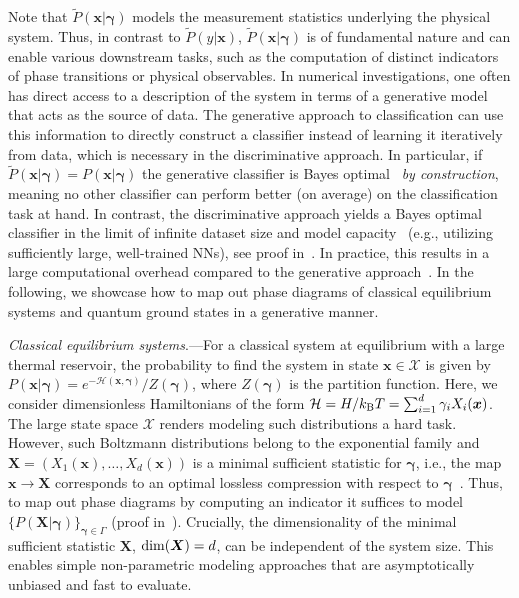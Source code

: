 \documentclass[twocolumn,aps,prl,superscriptaddress,tightlines,nofootinbib]{revtex4-2}
\begin{document}
\indent Note that $\tilde{P}(\bm{x}|\bm{\gamma})$ models the measurement statistics underlying the physical system. Thus, in contrast to $\tilde{P}(y|\bm{x})$, $\tilde{P}(\bm{x}|\bm{\gamma})$ is of fundamental nature and can enable various downstream tasks, such as the computation of distinct indicators of phase transitions or physical observables. In numerical investigations, one often has direct access to a description of the system in terms of a generative model that acts as the source of data. The generative approach to classification can use this information to directly construct a classifier instead of learning it iteratively from data, which is necessary in the discriminative approach. In particular, if $\tilde{P}(\bm{x}|\bm{\gamma}) = P(\bm{x}|\bm{\gamma})$ the generative classifier is Bayes optimal~\cite{devroye2:1996,goodfellow:2016} \textit{by construction}, meaning no other classifier can perform better (on average) on the classification task at hand. In contrast, the discriminative approach yields a Bayes optimal classifier in the limit of infinite dataset size and model capacity~\cite{goodfellow:2016} (e.g., utilizing sufficiently large, well-trained NNs), see proof in~\cite{suppl}. In practice, this results in a large computational overhead compared to the generative approach~\cite{suppl}. In the following, we showcase how to map out phase diagrams of classical equilibrium systems and quantum ground states in a generative manner.%

\indent \emph{Classical equilibrium systems}.---For a classical system at equilibrium with a large thermal reservoir, the probability to find the system in state $\bm{x} \in \mathcal{X}$ is given by $P(\bm{x}| \bm{\gamma}) = e^{-\mathcal{H}(\bm{x},\bm{\gamma})}/Z(\bm{\gamma})$,
where $Z(\bm{\gamma})$ is the partition function. Here, we consider dimensionless Hamiltonians of the form $\mathcal{H} = H/k_{\rm B}T = \sum_{i=1}^{d} \gamma_{i} X_{i}(\bm{x})$. The large state space $\mathcal{X}$ renders modeling such distributions a hard task. However, such Boltzmann distributions belong to the exponential family and $\bm{X} = \left( X_{1}(\bm{x}), \dots, X_{d}(\bm{x}) \right)$ is a minimal sufficient statistic for $\bm{\gamma}$, i.e., the map $\bm{x} \rightarrow \bm{X}$ corresponds to an optimal lossless compression with respect to $\bm{\gamma}$~\cite{non_optimal_compression}. Thus, to map out phase diagrams by computing an indicator it suffices to model $\{ P(\bm{X}|\bm{\gamma})\}_{\bm{\gamma} \in \Gamma}$ (proof in~\cite{suppl}). Crucially, the dimensionality of the minimal sufficient statistic $\bm{X}$, ${\rm dim}(\bm{X}) = d$, can be independent of the system size. This enables simple non-parametric modeling approaches that are asymptotically unbiased and fast to evaluate. 
\end{document}
